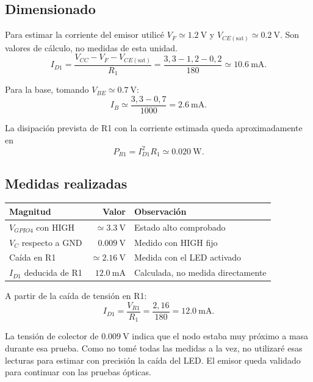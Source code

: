 \documentclass[11pt,a4paper]{article}
\begin{document}
\subsection{Dimensionado}
Para estimar la corriente del emisor utilicé $V_F\simeq\SI{1.2}{\volt}$ y $V_{CE(\mathrm{sat})}\simeq\SI{0.2}{\volt}$. Son valores de cálculo, no medidas de esta unidad.
\begin{equation}
I_{D1}=\frac{V_{CC}-V_F-V_{CE(\mathrm{sat})}}{R_1}
=\frac{3{,}3-1{,}2-0{,}2}{180}
\simeq\SI{10.6}{\milli\ampere}.
\end{equation}

Para la base, tomando $V_{BE}\simeq\SI{0.7}{\volt}$:
\begin{equation}
I_B\simeq\frac{3{,}3-0{,}7}{1000}
=\SI{2.6}{\milli\ampere}.
\end{equation}

La disipación prevista de R1 con la corriente estimada queda aproximadamente en
\begin{equation}
P_{R1}=I_{D1}^{2}R_1\simeq\SI{0.020}{\watt}.
\end{equation}

\subsection{Medidas realizadas}
\begin{center}
\begin{tabularx}{\linewidth}{@{}X r X@{}}
\toprule
Magnitud & Valor & Observación\\
\midrule
$V_{GPIO4}$ con HIGH & $\simeq\SI{3.3}{\volt}$ & Estado alto comprobado\\
$V_{C}$ respecto a GND & $\SI{0.009}{\volt}$ & Medido con HIGH fijo\\
Caída en R1 & $\simeq\SI{2.16}{\volt}$ & Medida con el LED activado\\
$I_{D1}$ deducida de R1 & $\SI{12.0}{\milli\ampere}$ & Calculada, no medida directamente\\
\bottomrule
\end{tabularx}
\end{center}

A partir de la caída de tensión en R1:
\begin{equation}
I_{D1}=\frac{V_{R1}}{R_1}=\frac{2{,}16}{180}
=\SI{12.0}{\milli\ampere}.
\end{equation}

La tensión de colector de $\SI{0.009}{\volt}$ indica que el nodo estaba muy próximo a masa durante esa prueba. Como no tomé todas las medidas a la vez, no utilizaré esas lecturas para estimar con precisión la caída del LED. El emisor queda validado para continuar con las pruebas ópticas.
\end{document}
